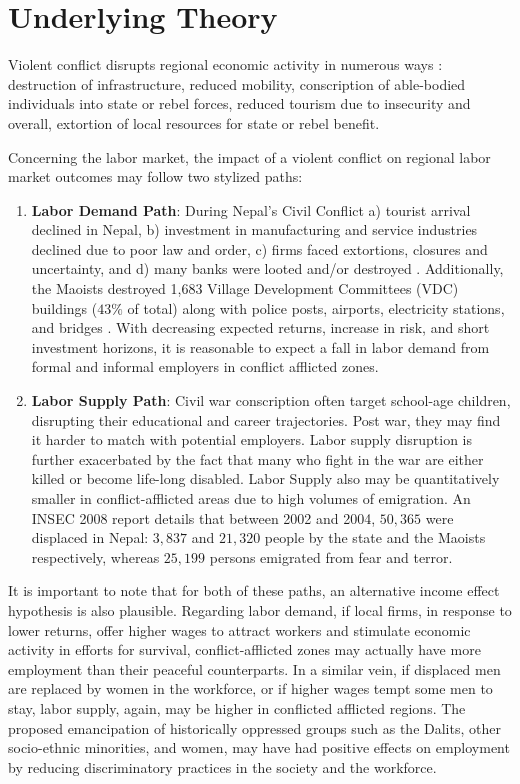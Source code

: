 \documentclass[12pt,a4paper]{article}
\begin{document}
\section{Underlying Theory}
Violent conflict disrupts regional economic activity in numerous ways : destruction of infrastructure, reduced mobility, conscription of able-bodied individuals into state or rebel forces, reduced tourism due to insecurity and overall, extortion of local resources for state or rebel benefit.

Concerning the labor market, the impact of a violent conflict on regional labor market outcomes may follow two stylized paths:

\begin{enumerate}
	\item \textbf{Labor Demand Path}: During Nepal's Civil Conflict a) tourist arrival declined in Nepal, b) investment in manufacturing and service industries declined due to poor law and order, c) firms faced extortions, closures and uncertainty, and d) many banks were looted and/or destroyed \parencite{lawoti2009violent}. Additionally, the Maoists destroyed 1,683 Village Development Committees (VDC) buildings ($43\%$ of total) along with police posts, airports, electricity stations, and bridges \parencite{lawoti2009violent}. With decreasing expected returns, increase in risk, and short investment horizons, it is reasonable to expect a fall in labor demand from formal and informal employers in conflict afflicted zones. 
	
	\item \textbf{Labor Supply Path}: Civil war conscription often target school-age children, disrupting their educational and career trajectories. Post war, they may find it harder to match with potential employers. Labor supply disruption is further exacerbated by the fact that many who fight in the war are either killed or become life-long disabled. Labor Supply also may be quantitatively smaller in conflict-afflicted areas due to high volumes of emigration. An INSEC 2008 \parencite{insec2008} report details that between 2002 and 2004, $50,365$ were displaced in Nepal: $3,837$ and $21,320$ people by the state and the Maoists respectively, whereas $25,199$ persons emigrated from fear and terror.
\end{enumerate}

It is important to note that for both of these paths, an alternative income effect hypothesis is also plausible. Regarding labor demand, if local firms, in response to lower returns, offer higher wages to attract workers and stimulate economic activity in efforts for survival, conflict-afflicted zones may actually have more employment than their peaceful counterparts. In a similar vein, if displaced men are replaced by women in the workforce, or if higher wages tempt some men to stay, labor supply, again, may be higher in conflicted afflicted regions. The proposed emancipation of historically oppressed groups such as the Dalits, other socio-ethnic minorities, and women, may have had positive effects on employment by reducing discriminatory practices in the society and the workforce.
\end{document}
